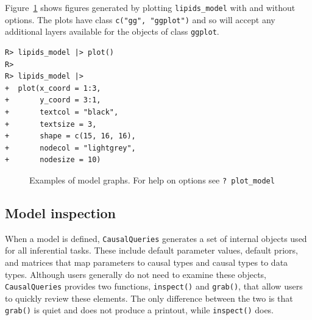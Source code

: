 \documentclass[
  11pt,
  article]{jss}
\begin{document}
Figure~\ref{fig-plots} shows figures generated by plotting
\texttt{lipids\_model} with and without options. The plots have class
\texttt{c("gg",\ "ggplot")} and so will accept any additional layers
available for the objects of class \texttt{ggplot}.

\begin{verbatim}
R> lipids_model |> plot()
R> 
R> lipids_model |>
+  plot(x_coord = 1:3,
+       y_coord = 3:1,
+       textcol = "black",
+       textsize = 3,
+       shape = c(15, 16, 16),
+       nodecol = "lightgrey",
+       nodesize = 10)
\end{verbatim}

\begin{figure}[h]

\begin{minipage}{0.50\linewidth}



\end{minipage}%
%
\begin{minipage}{0.50\linewidth}



\end{minipage}%

\caption{\label{fig-plots}Examples of model graphs. For help on options
see \texttt{?\ plot\_model}}

\end{figure}%

\subsection{Model inspection}\label{model-inspection}

When a model is defined, \texttt{CausalQueries} generates a set of
internal objects used for all inferential tasks. These include default
parameter values, default priors, and matrices that map parameters to
causal types and causal types to data types. Although users generally do
not need to examine these objects, \texttt{CausalQueries} provides two
functions, \texttt{inspect()} and \texttt{grab()}, that allow users to
quickly review these elements. The only difference between the two is
that \texttt{grab()} is quiet and does not produce a printout, while
\texttt{inspect()} does.
\end{document}
